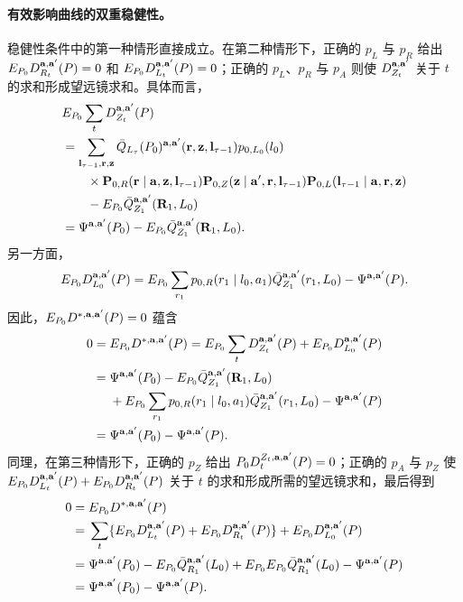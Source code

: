 \paragraph*{有效影响曲线的双重稳健性。}
稳健性条件中的第一种情形直接成立。在第二种情形下，正确的 $p_L$ 与 $p_R$ 给出 $E_{P_0}D_{R_t}^{\mathbf a,\mathbf a'}(P)=0$ 和 $E_{P_0}D_{L_t}^{\mathbf a,\mathbf a'}(P)=0$；正确的 $p_L$、$p_R$ 与 $p_A$ 则使 $D_{Z_t}^{\mathbf a,\mathbf a'}$ 关于 $t$ 的求和形成望远镜求和。具体而言，
\begingroup\small
\[
\begin{aligned}
&E_{P_0}\sum_tD_{Z_t}^{\mathbf a,\mathbf a'}(P)\\
&=\sum_{\mathbf l_{\tau-1},\mathbf r,\mathbf z}
 \bar Q_{L_\tau}(P_0)^{\mathbf a,\mathbf a'}(\mathbf r,\mathbf z,\mathbf l_{\tau-1})
 p_{0,L_0}(l_0)\\
&\qquad\times\mathbf P_{0,R}(\mathbf r\mid\mathbf a,\mathbf z,\mathbf l_{\tau-1})
 \mathbf P_{0,Z}(\mathbf z\mid\mathbf a',\mathbf r,\mathbf l_{\tau-1})
 \mathbf P_{0,L}(\mathbf l_{\tau-1}\mid\mathbf a,\mathbf r,\mathbf z)\\
&\qquad-E_{P_0}\bar Q_{Z_1}^{\mathbf a,\mathbf a'}(\mathbf R_1,L_0)\\
&=\Psi^{\mathbf a,\mathbf a'}(P_0)-E_{P_0}\bar Q_{Z_1}^{\mathbf a,\mathbf a'}(\mathbf R_1,L_0).
\end{aligned}
\]
\endgroup
另一方面，
\[
E_{P_0}D_{L_0}^{\mathbf a,\mathbf a'}(P)
 =E_{P_0}\sum_{r_1}p_{0,R}(r_1\mid l_0,a_1)
 \bar Q_{Z_1}^{\mathbf a,\mathbf a'}(r_1,L_0)-\Psi^{\mathbf a,\mathbf a'}(P).
\]
因此，$E_{P_0}D^{*,\mathbf a,\mathbf a'}(P)=0$ 蕴含
\[
\begin{aligned}
0={}&E_{P_0}D^{*,\mathbf a,\mathbf a'}(P)
 =E_{P_0}\sum_tD_{Z_t}^{\mathbf a,\mathbf a'}(P)+E_{P_0}D_{L_0}^{\mathbf a,\mathbf a'}(P)\\
={}&\Psi^{\mathbf a,\mathbf a'}(P_0)-E_{P_0}\bar Q_{Z_1}^{\mathbf a,\mathbf a'}(\mathbf R_1,L_0)\\
&+E_{P_0}\sum_{r_1}p_{0,R}(r_1\mid l_0,a_1)\bar Q_{Z_1}^{\mathbf a,\mathbf a'}(r_1,L_0)
 -\Psi^{\mathbf a,\mathbf a'}(P)\\
={}&\Psi^{\mathbf a,\mathbf a'}(P_0)-\Psi^{\mathbf a,\mathbf a'}(P).
\end{aligned}
\]
同理，在第三种情形下，正确的 $p_Z$ 给出 $P_0D_t^{Z_t,\mathbf a,\mathbf a'}(P)=0$；正确的 $p_A$ 与 $p_Z$ 使 $E_{P_0}D_{L_t}^{\mathbf a,\mathbf a'}(P)+E_{P_0}D_{R_t}^{\mathbf a,\mathbf a'}(P)$ 关于 $t$ 的求和形成所需的望远镜求和，最后得到
\[
\begin{aligned}
0={}&E_{P_0}D^{*,\mathbf a,\mathbf a'}(P)\\
={}&\sum_t\{E_{P_0}D_{L_t}^{\mathbf a,\mathbf a'}(P)
 +E_{P_0}D_{R_t}^{\mathbf a,\mathbf a'}(P)\}
 +E_{P_0}D_{L_0}^{\mathbf a,\mathbf a'}(P)\\
={}&\Psi^{\mathbf a,\mathbf a'}(P_0)-E_{P_0}\bar Q_{R_1}^{\mathbf a,\mathbf a'}(L_0)
 +E_{P_0}E_{P_0}\bar Q_{R_1}^{\mathbf a,\mathbf a'}(L_0)-\Psi^{\mathbf a,\mathbf a'}(P)\\
={}&\Psi^{\mathbf a,\mathbf a'}(P_0)-\Psi^{\mathbf a,\mathbf a'}(P).
\end{aligned}
\]
